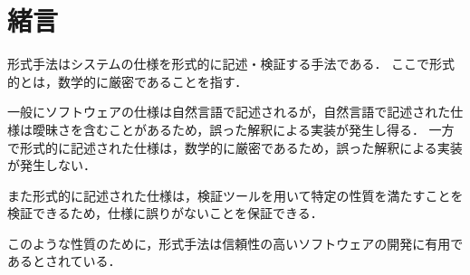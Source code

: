 \documentclass[main]{subfiles}
\begin{document}
\chapter{緒言}


形式手法はシステムの仕様を形式的に記述・検証する手法である．
ここで形式的とは，数学的に厳密であることを指す．

一般にソフトウェアの仕様は自然言語で記述されるが，自然言語で記述された仕様は曖昧さを含むことがあるため，誤った解釈による実装が発生し得る．
一方で形式的に記述された仕様は，数学的に厳密であるため，誤った解釈による実装が発生しない．

また形式的に記述された仕様は，検証ツールを用いて特定の性質を満たすことを検証できるため，仕様に誤りがないことを保証できる．

このような性質のために，形式手法は信頼性の高いソフトウェアの開発に有用であるとされている．
\end{document}
